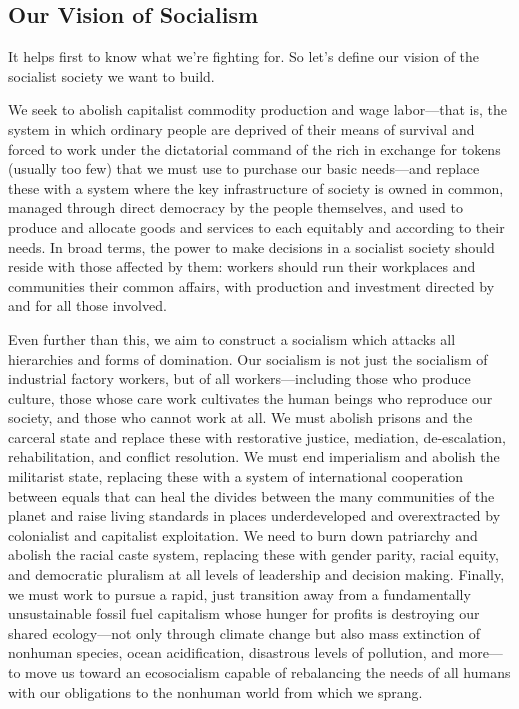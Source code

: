 \documentclass[10pt]{memoir}
\begin{document}
\subsection{Our Vision of Socialism}\label{our-vision-of-socialism}

It helps first to know what we're fighting for. So let's define our
vision of the socialist society we want to build.

We seek to abolish capitalist commodity production and wage labor---that
is, the system in which ordinary people are deprived of their means of
survival and forced to work under the dictatorial command of the rich in
exchange for tokens (usually too few) that we must use to purchase our
basic needs---and replace these with a system where the key
infrastructure of society is owned in common, managed through direct
democracy by the people themselves, and used to produce and allocate
goods and services to each equitably and according to their needs. In
broad terms, the power to make decisions in a socialist society should
reside with those affected by them: workers should run their workplaces
and communities their common affairs, with production and investment
directed by and for all those involved.

Even further than this, we aim to construct a socialism which attacks
all hierarchies and forms of domination. Our socialism is not just the
socialism of industrial factory workers, but of all workers---including
those who produce culture, those whose care work cultivates the human
beings who reproduce our society, and those who cannot work at all. We
must abolish prisons and the carceral state and replace these with
restorative justice, mediation, de-escalation, rehabilitation, and
conflict resolution. We must end imperialism and abolish the militarist
state, replacing these with a system of international cooperation
between equals that can heal the divides between the many communities of
the planet and raise living standards in places underdeveloped and
overextracted by colonialist and capitalist exploitation. We need to
burn down patriarchy and abolish the racial caste system, replacing
these with gender parity, racial equity, and democratic pluralism at all
levels of leadership and decision making. Finally, we must work to
pursue a rapid, just transition away from a fundamentally unsustainable
fossil fuel capitalism whose hunger for profits is destroying our shared
ecology---not only through climate change but also mass extinction of
nonhuman species, ocean acidification, disastrous levels of pollution,
and more---to move us toward an ecosocialism capable of rebalancing the
needs of all humans with our obligations to the nonhuman world from
which we sprang.
\end{document}
